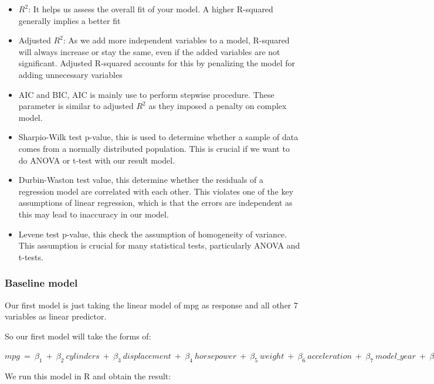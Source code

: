 \begin{itemize}
    \item $R^2$: It helps us assess the overall fit of your model. A higher R-squared generally implies a better fit
    \item Adjusted $R^2$: As we add more independent variables to a model, R-squared will always increase or stay the same, even if the added variables are not significant. Adjusted R-squared accounts for this by penalizing the model for adding unnecessary variables
    \item AIC and BIC, AIC is mainly use to perform stepwise procedure. These parameter is similar to adjusted $R^2$ as they imposed a penalty on complex model.
    \item Sharpio-Wilk test p-value, this is used to determine whether a sample of data comes from a normally distributed population. This is crucial if we want to do ANOVA or t-test with our result model.
    \item Durbin-Waston test value, this determine whether the residuals of a regression model are correlated with each other. This violates one of the key assumptions of linear regression, which is that the errors are independent as this may lead to inaccuracy in our model.
    \item Levene test p-value, this check the assumption of homogeneity of variance. This assumption is crucial for many statistical tests, particularly ANOVA and t-tests.
\end{itemize}

\subsubsection{Baseline model}

Our first model is just taking the linear model of mpg as response and all other 7 variables as linear predictor.

So our first model will take the forms of:

\begin{center}
$
mpg \ = \ \beta_1 \ + \ \beta_2 \ cylinders \ + \ \beta_3 \ displacement \ + \ \beta_4 \ horsepower \ + \ \beta_5 \ weight \ + \ \beta_6 \ acceleration \ + \ \beta_7 \ model\_year \ + \ \beta_8 \ origin \ + \ \epsilon
$
\end{center}

We run this model in R and obtain the result:

